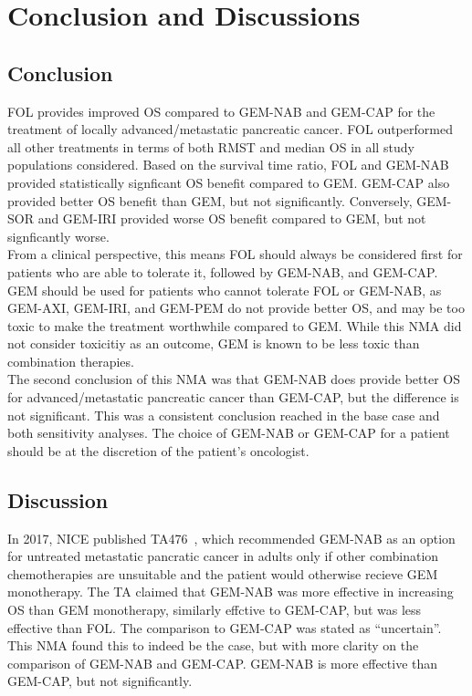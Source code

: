 \chapter{Conclusion and Discussions}\label{conclusions}

\section{Conclusion}
FOL provides improved OS compared to GEM-NAB and GEM-CAP for the treatment of locally advanced/metastatic pancreatic cancer. FOL outperformed all other treatments in terms of both RMST and median OS in all study populations considered. Based on the survival time ratio, FOL and GEM-NAB provided statistically signficant OS benefit compared to GEM. GEM-CAP also provided better OS benefit than GEM, but not significantly. Conversely, GEM-SOR and GEM-IRI provided worse OS benefit compared to GEM, but not signficantly worse. \\

From a clinical perspective, this means FOL should always be considered first for patients who are able to tolerate it, followed by GEM-NAB, and GEM-CAP. GEM should be used for patients who cannot tolerate FOL or GEM-NAB, as GEM-AXI, GEM-IRI, and GEM-PEM do not provide better OS, and may be too toxic to make the treatment worthwhile compared to GEM. While this NMA did not consider toxicitiy as an outcome, GEM is known to be less toxic than combination therapies. \\

The second conclusion of this NMA was that GEM-NAB does provide better OS for advanced/metastatic pancreatic cancer than GEM-CAP, but the difference is not significant. This was a consistent conclusion reached in the base case and both sensitivity analyses. The choice of GEM-NAB or GEM-CAP for a patient should be at the discretion of the patient's oncologist.

\section{Discussion}
In 2017, NICE published TA476~\cite{TA476}, which recommended GEM-NAB as an option for untreated metastatic pancratic cancer in adults only if other combination chemotherapies are unsuitable and the patient would otherwise recieve GEM monotherapy. The TA claimed that GEM-NAB was more effective in increasing OS than GEM monotherapy, similarly effctive to GEM-CAP, but was less effective than FOL. The comparison to GEM-CAP was stated as ``uncertain''. This NMA found this to indeed be the case, but with more clarity on the comparison of GEM-NAB and GEM-CAP. GEM-NAB is more effective than GEM-CAP, but not significantly. \\ 

